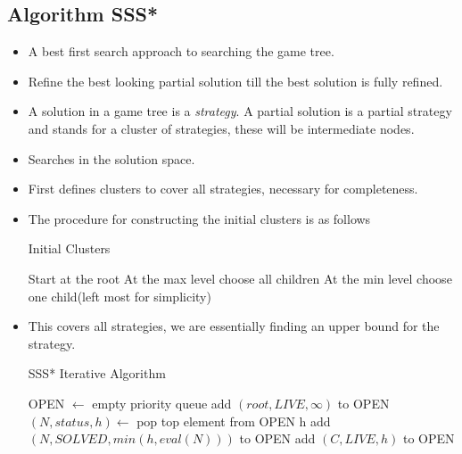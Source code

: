 \documentclass[a4paper]{article}
\begin{document}
\subsection{Algorithm SSS*}
\begin{itemize}
    \item A best first search approach to searching the game tree.
    \item Refine the best looking partial solution till the best solution is fully refined.
    \item A solution in a game tree is a \textit{strategy}. A partial solution is a partial strategy and stands for a cluster of strategies, these will be intermediate nodes.
    \item Searches in the solution space.
    \item First defines clusters to cover all strategies, necessary for completeness.
    \item The procedure for constructing the initial clusters is as follows
    \begin{algorithm}[H]
        \caption{Initial Clusters}\label{AI:alg-initial-clusters}
        \begin{algorithmic}[1]
            \State Start at the root
            \Repeat
                \State At the max level choose all children
                \State At the min level choose one child(left most for simplicity)
        \end{algorithmic}
    \end{algorithm}
    \item This covers all strategies, we are essentially finding an upper bound for the strategy.
    \begin{algorithm}[H]
        \caption{SSS* Iterative Algorithm}\label{AI:alg-SSS-star}
        \begin{algorithmic}[1]
            \Statex {}
            \State OPEN $\gets$ empty priority queue
            \State add $(root,LIVE,\infty)$ to OPEN
                \State $(N,status,h)\gets$ pop top element from OPEN
                    \State \Return h
                \EndIf
                \Statex
                        \State add $(N,SOLVED,min(h,eval(N)))$ to OPEN
                            \State add $(C,LIVE,h)$ to OPEN

\end{algorithmic}
\end{algorithm}
\end{itemize}
\end{document}
